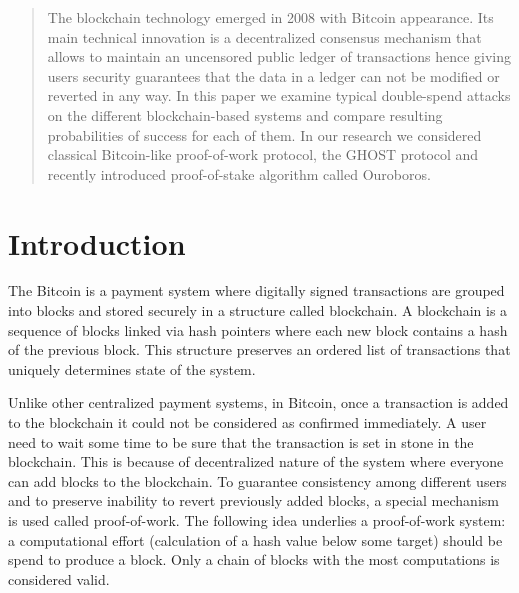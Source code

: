 \documentclass[10pt,a4paper]{article}
\numberwithin{equation}{section} %
\theoremstyle{plain}
\theoremstyle{definition}
\theoremstyle{remark}
\begin{document}
	
	
	
	\begin{abstract}
	The blockchain technology emerged in 2008 with Bitcoin appearance. Its main technical innovation is a decentralized consensus mechanism that allows to maintain an uncensored public ledger of transactions hence giving users security guarantees that the data in a ledger can not be modified or reverted in any way. In this paper we examine typical double-spend attacks on the different blockchain-based systems and compare resulting probabilities of success for each of them. In our research we considered classical Bitcoin-like proof-of-work protocol, the GHOST protocol and recently introduced proof-of-stake algorithm called Ouroboros.
	\end{abstract}
	
	
	\begin{flushleft}
		\eject 
		
	\end{flushleft}
	
	
	\tableofcontents
	
	\begin{flushleft}
		\eject 
		
	\end{flushleft}
	
	\section{Introduction}
	The Bitcoin is a payment system where digitally signed transactions are grouped into blocks and stored securely in a structure called blockchain. A blockchain is a sequence of blocks linked via hash pointers where each new block contains a hash of the previous block. This structure preserves an ordered list of transactions that uniquely determines state of the system.
	
	Unlike other centralized payment systems, in Bitcoin, once a transaction is added to the blockchain it could not be considered as confirmed immediately. A user need to wait some time to be sure that the transaction is set in stone in the blockchain. This is because of decentralized nature of the system where everyone can add blocks to the blockchain. To guarantee consistency among different users and to preserve inability to revert previously added blocks, a special mechanism is used called proof-of-work. The following idea underlies a proof-of-work system: a computational effort (calculation of a hash value below some target) should be spend to produce a block. Only a chain of blocks with the most computations is considered valid.
	
\end{document}
